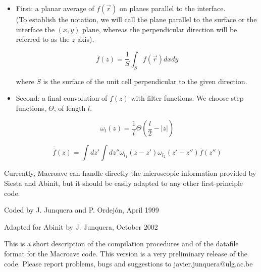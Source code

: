  \begin{itemize}
    \item First: a planar average of $f \left( \vec{r} \right)$
          on planes parallel to the interface. \\
          (To establish the notation, we will call the plane parallel
          to the surface or the interface the $(x,y)$ plane, whereas the
          perpendicular direction will be referred to as
          the $z$ axis).

          \begin{equation}
             \overline{f} \left( z \right) =
             \frac{1}{S} \int_{S}
             f \left( \vec{r} \right) dx dy
             \label{eq:planar}
          \end{equation}

          \noindent where $S$ is the surface of the unit cell perpendicular
                    to the given direction.
     \item Second: a final convolution of $\overline{f} \left( z \right)$
           with filter functions. We choose
           step functions, $\Theta$, of length $l$.

            \begin{equation}
                \omega_{l} \left( z \right)
                 = \frac{1}{l} \Theta\left( \frac{l}{2} - |z| \right)
                \label{eq:step}
            \end{equation}



            \begin{equation}
               \overline{ \overline{f}} \left( z \right) =
                       \int dz' \int dz'' \omega_{l_{1}} \left( z-z' \right)
                       \omega_{l_{2}} \left( z'-z'' \right)
                       \overline{f} \left( z'' \right)
               \label{eq:macro}
            \end{equation}
 \end{itemize}

 Currently, {\sc Macroave} can handle directly the microscopic
 information provided by {\sc Siesta}
 and {\sc Abinit}, but it should be easily adapted to any other
 first-principle code.

 Coded by J. Junquera and P. Ordej\'on, April 1999

 Adapted for {\sc Abinit} by J. Junquera, October 2002


 This is a short description of the compilation procedures
 and of the datafile format for the {\sc Macroave} code.
 This version is a very preliminary release of the code.
 Please report problems, bugs and suggestions to
 javier.junquera@ulg.ac.be

